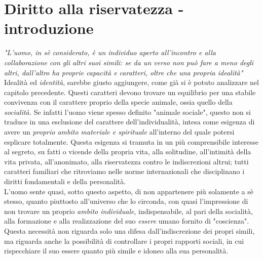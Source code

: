 


\section{Diritto alla riservatezza - introduzione}
\textit{"L'uomo, in sè considerato, è un individuo aperto all'incontro e alla collaborazione con gli altri suoi simili: se da un verso non può fare a meno degli altri, dall'altro ha proprie capacità e caratteri, oltre che una propria idealità"}
\\Idealità ed \textit{identità}, sarebbe giusto aggiungere, come già si è potuto analizzare nel capitolo precedente.
Questi caratteri devono trovare un equilibrio per una stabile convivenza con il carattere proprio della specie animale, ossia quello della \textit{socialità.} Se infatti l'uomo viene spesso definito "animale sociale", questo non si traduce in una esclusione del carattere dell'individualità, intesa come esigenza di avere un \textit{proprio ambito materiale e spirituale} all'interno del quale potersi esplicare totalmente.
Questa esigenza si tramuta in un più comprensibile interesse al segreto, su fatti o vicende della propria vita, alla solitudine, all'intimità della vita privata, all'anonimato, alla riservatezza contro le indiscrezioni altrui; tutti caratteri familiari che ritroviamo nelle norme internazionali che disciplinano i diritti fondamentali e della personalità.
\\L'uomo sente quasi, sotto questo aspetto, di non appartenere più solamente a sè stesso, quanto piuttosto all'universo che lo circonda, con quasi l'impressione di non trovare un proprio \textit{ambito individuale}, indispensabile, al pari della socialità, alla formazione e alla realizzazione del suo \textit{essere} umano fornito di "coscienza".
Questa necessità non riguarda solo una difesa dall'indiscrezione dei propri simili, ma riguarda anche la possibilità di controllare i propri rapporti sociali, in cui rispecchiare il suo essere quanto più simile e idoneo alla sua personalità.

